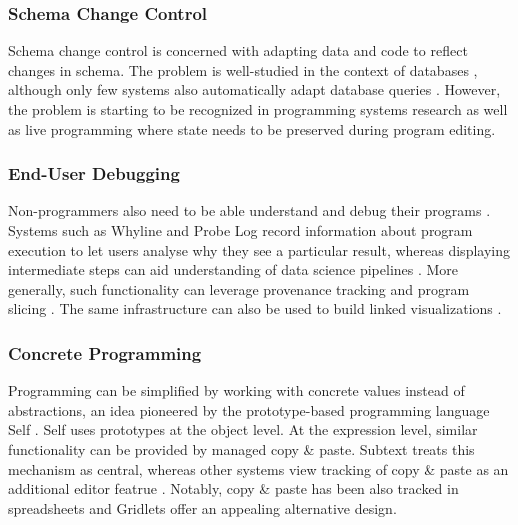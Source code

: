 \documentclass[sigconf,anonymous,screen]{acmart}
\begin{document}
\subsubsection*{Schema Change Control}
Schema change control is concerned with adapting data and code to reflect changes in schema.
The problem is well-studied in the context of databases \cite{brahmia-2024-evolution},
although only few systems also automatically adapt database queries \cite{wang-2019-schema}.
However, the problem is starting to be recognized in programming systems research
\cite{litt-2020-cambria,edwards-2025-schema} as well as live programming \cite{barenz-2020-live}
where state needs to be preserved during program editing.

\subsubsection*{End-User Debugging}
Non-programmers also need to be able understand and debug their programs \cite{kissinger-2006-debugging}.
Systems such as Whyline and Probe Log \cite{ko-2004-whyline,ko-2009-whyline,krebs-2023-probelog}
record information about program execution to let users analyse why they see a particular result,
whereas displaying intermediate steps can aid understanding of data science pipelines \cite{shrestha-2021-unravel}.
More generally, such functionality can leverage provenance tracking \cite{cheney-2009-provenance}
and program slicing \cite{ricciotti-2017-imperative,perera-2012-functional}. The same infrastructure
can also be used to build linked visualizations \cite{perera-2022-linked}.

\subsubsection*{Concrete Programming}
Programming can be simplified by working with concrete values instead of abstractions, an idea
pioneered by the prototype-based programming language Self \cite{ungar-1987-self}. Self uses
prototypes at the object level. At the expression level, similar functionality can be provided
by managed copy \& paste. Subtext \cite{edwards-2006-copypaste,edwards-2022-copypaste} treats this
mechanism as central, whereas other systems view tracking of copy \& paste as an additional
editor featrue \cite{jablonski-2007-cren,toomim-2004-linked}. Notably, copy \& paste has been
also tracked in spreadsheets \cite{hermans-2015-copypaste} and Gridlets \cite{joharizadeh-2020-gridlets}
offer an appealing alternative design.
\end{document}
